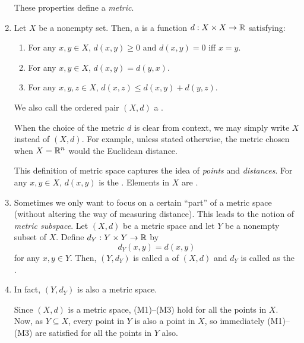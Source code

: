 \begin{enumerate}
\begin{itemize}
\begin{center}
\end{center}
\end{itemize}
These properties define a \emph{metric}.
\item Let \(X\) be a nonempty set. Then, a  is a function
\(d:X\times X\to\mathbb{R}\) satisfying:
\begin{enumerate}[label={(M\arabic*)}]
\item For any \(x,y\in X\), \(d(x,y)\ge 0\) and \(d(x,y)=0\) iff \(x=y\).
\item For any \(x,y\in X\), \(d(x,y)=d(y,x)\).
\item For any \(x,y,z\in X\), \(d(x,z)\le d(x,y)+d(y,z)\).
\end{enumerate}
We also call the ordered pair \((X,d)\) a .

\begin{note}
When the choice of the metric \(d\) is clear from context, we may simply write
\(X\) instead of \((X,d)\). For example, unless stated otherwise, the metric
chosen when \(X=\mathbb{R}^n\) would the Euclidean distance.
\end{note}

This definition of metric space captures the idea of \emph{points} and
\emph{distances}. For any \(x,y\in X\), \(d(x,y)\) is the . Elements in \(X\) are
.

\item Sometimes we only want to focus on a certain ``part'' of a metric space
(without altering the way of measuring distance). This leads to the notion of
\emph{metric subspace}. Let \((X,d)\) be a metric space and let \(Y\) be a
nonempty subset of \(X\). Define \(d_Y:Y\times  Y\to \mathbb{R}\) by
\[
d_Y(x,y)=d(x,y)
\]
for any \(x,y\in Y\). Then, \((Y,d_Y)\) is called a  of
\((X,d)\) and \(d_Y\) is called as the .

\item\label{it:metric-subspace-is-ms} In fact, \((Y,d_Y)\) is also a metric space.

\begin{pf}
Since \((X,d)\) is a metric space, (M1)--(M3) hold for all the points in \(X\).
Now, as \(Y\subseteq X\), every point in \(Y\) is also a point in \(X\), so
immediately (M1)--(M3) are satisfied for all the points in \(Y\) also.
\end{pf}
\end{enumerate}
